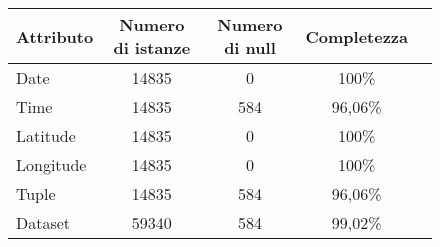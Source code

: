 \begin{figure}[H]
	\centering
	\begin{tabular}{lcccc}
		\toprule
		\textbf{Attributo} \quad & \textbf{Numero di istanze} & \textbf{Numero di null} & \textbf{Completezza} \\
		\midrule
		Date &               14835  & 0                      & 100\%      \\ 
		Time 	&               14835  & 584                      & 96,06\%      \\ 
		Latitude &              14835  & 0                      & 100\%      \\ 
		Longitude &             14835  & 0                      & 100\%      \\ 
		\midrule
		Tuple 		&				14835  &	584			   & 96,06\%\\
		Dataset  	&	   59340  &	584 		   & 99,02\%\\
		\bottomrule
	\end{tabular}
	\label{tab:completezza spray}
\end{figure}

